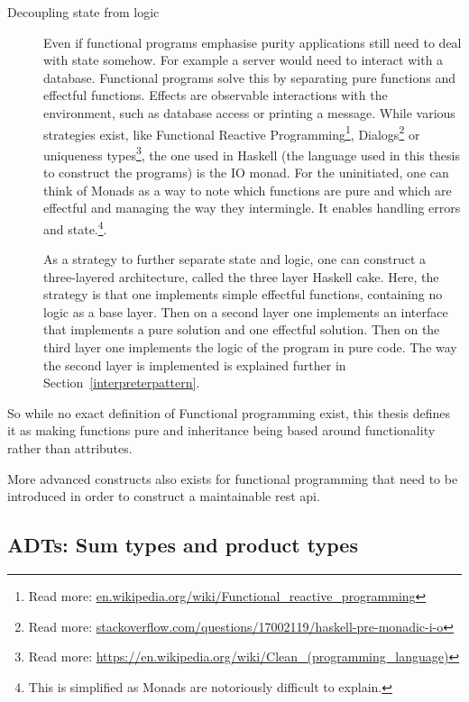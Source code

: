 \begin{description}
\item[Decoupling state from logic]

Even if functional programs emphasise purity applications still need to deal
        with state somehow. For example a server would need to interact with a
        database. Functional programs solve this by separating pure functions
        and effectful functions. Effects are observable interactions with the
        environment, such as database access or printing a message.  While
        various strategies exist, like Functional Reactive
        Programming\footnote{Read more:
        \url{en.wikipedia.org/wiki/Functional_reactive_programming}},
        Dialogs\footnote{Read more:
        \url{stackoverflow.com/questions/17002119/haskell-pre-monadic-i-o}} or
        uniqueness types\footnote{Read more:
        \url{https://en.wikipedia.org/wiki/Clean_(programming_language)}}, the
        one used in Haskell (the language used in this thesis to construct the
        programs) is the IO monad. For the uninitiated, one can think of Monads
        as a way to note which functions are pure and which are effectful and
        managing the way they intermingle. It enables handling errors
        and state.\footnote{This is simplified as Monads are notoriously
        difficult to explain.}. 

As a strategy to further separate state and logic, one can construct a
        three-layered architecture, called the three layer Haskell cake. Here,
        the strategy is that one implements simple effectful functions,
        containing no logic as a base layer. Then on a second layer one
        implements an interface that implements a pure solution and one
        effectful solution. Then on the third layer one implements the logic of
        the program in pure code. The way the second layer is implemented is
        explained further in Section~\ref{interpreterpattern}. 
\end{description}

So while no exact definition of Functional programming exist, this thesis
defines it as making functions pure and inheritance being based around
functionality rather than attributes. 

More advanced constructs also exists for functional programming that need to be
introduced in order to construct a maintainable rest api.

\subsection{ADTs: Sum types and product types}\label{types}

